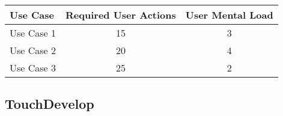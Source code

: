 


\begin{tabularx}{\textwidth}{Xcc}
\textbf{Use Case} & \textbf{Required User Actions} & \textbf{User Mental Load}\\
\hline
Use Case 1                          & 15 & 3 \\
Use Case 2                          & 20 & 4 \\
Use Case 3                          & 25 & 2
\end{tabularx}

\subsection{TouchDevelop}




